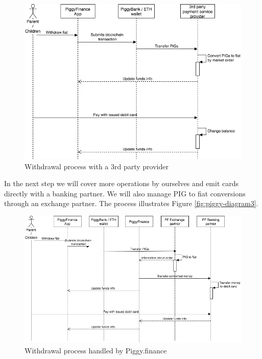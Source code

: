 \documentclass[english]{article}
\begin{document}
\begin{figure}[h]
    \centering
    \includegraphics[width=1\textwidth]{PiggyBank-Diagram2.png}
    \caption{Withdrawal process with a 3rd party provider}
    \label{fig:piggy-diagram2}
\end{figure}

In the next step we will cover more operations by ourselves and emit cards directly with a banking partner. We will also manage PIG to fiat conversions through an exchange partner. The process illustrates Figure \ref{fig:piggy-diagram3}.

\begin{figure}[h]
    \centering
    \includegraphics[width=1\textwidth]{PiggyBank-Diagram3.png}
    \caption{Withdrawal process handled by Piggy.finance}
    \label{fig:piggy-diagram2}
\end{figure}
\end{document}
